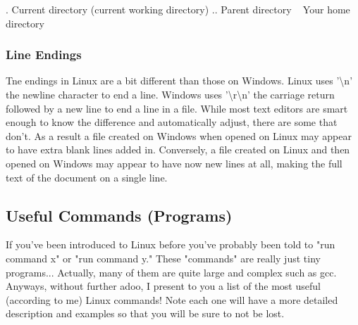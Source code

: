 	.	Current directory (current working directory)
	..	Parent directory
	~	Your home directory


\subsubsection{Line Endings} \mdseries
Tne endings in Linux are a bit different than those on Windows.  Linux uses '\textbackslash n' the newline character to end a line.  Windows uses '\textbackslash r\textbackslash n' the carriage return followed by a new line to end a line in a file.  While most text editors are smart enough to know the difference and automatically adjust, there are some that don't.  As a result a file created on Windows when opened on Linux may appear to have extra blank lines added in.  Conversely, a file created on Linux and then opened on Windows may appear to have now new lines at all, making the full text of the document on a single line.


\subsection{Useful Commands (Programs)} \mdseries
If you've been introduced to Linux before you've probably been told to "run command x" or "run command y."  These "commands" are really just tiny programs... Actually, many of them are quite large and complex such as gcc.  Anyways, without further adoo, I present to you a list of the most useful (according to me) Linux commands!  Note each one will have a more detailed description and examples so that you will be sure to not be lost.

